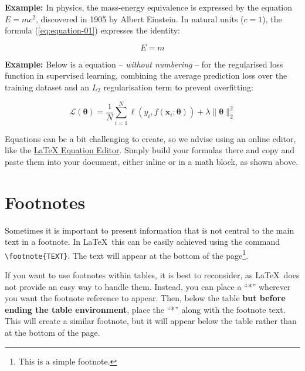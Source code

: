 {	\vspace{.875em}
	\textbf{Example:} In physics, the mass-energy equivalence is expressed by the equation \(E=mc^2\), discovered in 1905 by Albert Einstein. In natural units ($c = 1$), the formula (\ref{eq:equation-01}) expresses the identity:

	\begin{equation}
		\label{eq:equation-01}
		E=m
	\end{equation}

	\textbf{Example:} Below is a equation -- \textit{without numbering} -- for the regularised loss function in supervised learning, combining the average prediction loss over the training dataset and an $L_2$ regularisation term to prevent overfitting:

	\[
		\mathcal{L}(\boldsymbol{\theta}) = \frac{1}{N} \sum_{i=1}^{N} \ell(y_i, f(\mathbf{x}_i; \boldsymbol{\theta})) + \lambda \|\boldsymbol{\theta}\|_2^2
	\]

	Equations can be a bit challenging to create, so we advise using an online editor, like the \href{https://latexeditor.lagrida.com/}{LaTeX Equation Editor}. Simply build your formulas there and copy and paste them into your document, either inline or in a math block, as shown above.

	\section{Footnotes}
	Sometimes it is important to present information that is not central to the main text in a footnote. In \LaTeX\, this can be easily achieved using the command \verb|\footnote{TEXT}|. The text will appear at the bottom of the page\footnote{This is a simple footnote.}.

	If you want to use footnotes within tables, it is best to reconsider, as \LaTeX\ does not provide an easy way to handle them. Instead, you can place a ``*'' wherever you want the footnote reference to appear. Then, below the table \textbf{but before ending the table environment}, place the ``*'' along with the footnote text. This will create a similar footnote, but it will appear below the table rather than at the bottom of the page.
}